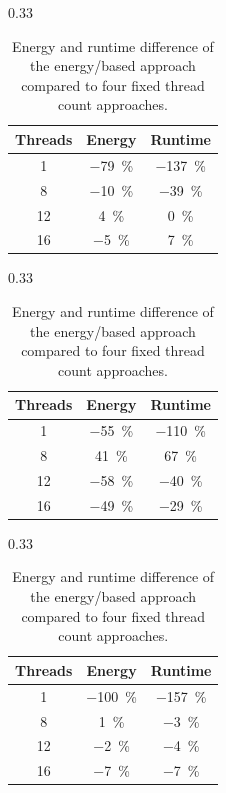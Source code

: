 \begin{table}[ht]
  \begin{subtable}{0.33\linewidth}
    \centering
    \begin{tabular}{ccc}\toprule
      Threads & Energy & Runtime \\\midrule
      1  & \qty{-79}{\percent} & \qty{-137}{\percent} \\
      8  & \qty{-10}{\percent} & \qty{-39}{\percent} \\
      12 & \qty{4}{\percent}   & \qty{0}{\percent} \\
      16 & \qty{-5}{\percent}  & \qty{7}{\percent} \\
    \bottomrule\end{tabular}%
    \caption{Nine-point stencil.}%
    \label{tab:static-stencil}
  \end{subtable}%
  \hfill
  \begin{subtable}{0.33\linewidth}
    \centering
    \begin{tabular}{ccc}\toprule
      Threads & Energy & Runtime \\\midrule
      1  & \qty{-55}{\percent} & \qty{-110}{\percent} \\
      8  & \qty{41}{\percent} & \qty{67}{\percent} \\
      12 & \qty{-58}{\percent} & \qty{-40}{\percent} \\
      16 & \qty{-49}{\percent} & \qty{-29}{\percent} \\
    \bottomrule\end{tabular}%
    \caption{Matrix multiplication.}%
    \label{tab:static-matmul}
  \end{subtable}%
  \hfill
  \begin{subtable}{0.33\linewidth}
    \centering
    \begin{tabular}{ccc}\toprule
      Threads & Energy & Runtime \\\midrule
      1  & \qty{-100}{\percent} & \qty{-157}{\percent} \\
      8  & \qty{1}{\percent}    & \qty{-3}{\percent} \\
      12 & \qty{-2}{\percent}   & \qty{-4}{\percent} \\
      16 & \qty{-7}{\percent}   & \qty{-7}{\percent} \\
    \bottomrule\end{tabular}%
    \caption{Rust implementation.}%
    \label{tab:static-rust}
  \end{subtable}%
  \caption{Energy and runtime difference of the energy\-/based approach compared to four fixed thread count approaches.}%
  \label{fig:static}
\end{table}

